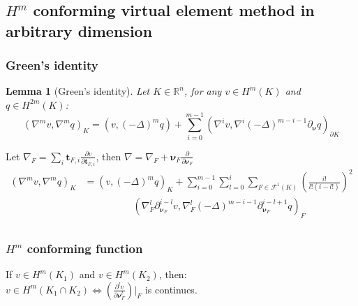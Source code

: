 \documentclass[notheorems,serif]{beamer}
\newtheorem{lemma}{\textbf{Lemma}}
\begin{document}
\begin{CJK}{UTF8}{gkai}
\section{$H^m$ conforming virtual element method in arbitrary dimension}
\begin{frame}
    \frametitle{Green's identity}
  \begin{lemma}[Green's identity]
      Let $K\in\mathbb{R}^n$, for any $v \in H^m(K)$ and $q \in H^{2m}(K)$:
      $$
      (\nabla^m v, \nabla^m q)_K = (v, (-\Delta)^m q) + \sum_{i=0}^{m-1}
      (\nabla^i v, \nabla^i(-\Delta)^{m-i-1}\partial_{\boldsymbol{\nu}}q)_{\partial K}
      $$
  \end{lemma}
  Let $\nabla_F  = \sum_{i}\boldsymbol{t}_{F, i}
  \frac{\partial v}{\partial \boldsymbol{t}_{F, i}}$, then $\nabla = \nabla_F +
  \boldsymbol{\nu}_F \frac{\partial }{\partial \boldsymbol{\nu}_F}$
  $$
  \begin{aligned}
  (\nabla^m v, \nabla^m q)_K
  & = (v, (-\Delta)^m q)_K + \sum_{i=0}^{m-1}
     \sum_{l=0}^i\sum_{F\in\mathcal{F}^1(K)}
     \left(\frac{i!}{l!(i-l!)}\right)^2
     \\
     & \quad\quad\quad\quad\quad(\nabla^{l}_{F}\partial^{i-l}_{\boldsymbol\nu_F} v,
     \nabla^{l}_{F}
     (-\Delta)^{m-i-1}\partial^{i-l+1}_{\boldsymbol\nu_F}q)_F\\
  \end{aligned}
  $$
\end{frame}

\begin{frame}
    \frametitle{$H^m$ conforming function}
  If $v \in H^m(K_1)$ and $v \in H^m(K_2)$, then:\\
  \vspace{0.5cm}
  \centering
  $v \in H^m(K_1\cap K_2) \Longleftrightarrow  
  (\frac{\partial^l v}{\partial \boldsymbol{\nu}_F^l})|_F$ is continues.


\end{frame}
\end{CJK}
\end{document}
